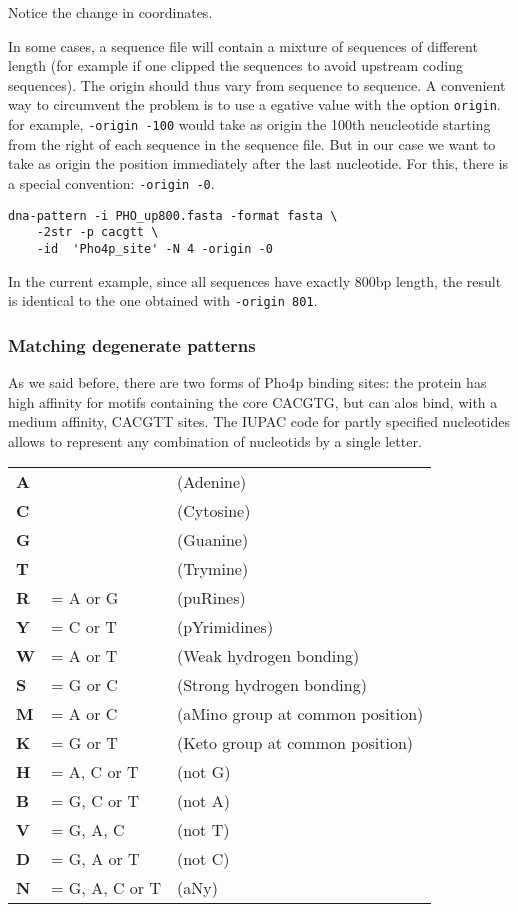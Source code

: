 Notice the change in coordinates.

In some cases, a sequence file will contain a mixture of sequences of
different length (for example if one clipped the sequences to avoid
upstream coding sequences). The origin should thus vary from sequence
to sequence. A convenient way to circumvent the problem is to use a
egative value with the option \texttt{origin}. for example,
\texttt{-origin -100} would take as origin the 100th neucleotide
starting from the right of each sequence in the sequence file. But in
our case we want to take as origin the position immediately after the
last nucleotide. For this, there is a special convention: \texttt{-origin
-0}.

\begin{verbatim}
dna-pattern -i PHO_up800.fasta -format fasta \
    -2str -p cacgtt \
    -id  'Pho4p_site' -N 4 -origin -0
\end{verbatim}

In the current example, since all sequences have exactly 800bp length,
the result is identical to the one obtained with \texttt{-origin 801}.

\subsubsection{Matching degenerate patterns}

As we said before, there are two forms of Pho4p binding sites: the
protein has high affinity for motifs containing the core CACGTG, but
can alos bind, with a medium affinity, CACGTT sites. The IUPAC code
for partly specified nucleotides allows to represent any combination
of nucleotids by a single letter.

\begin{tabular}{lll}
\textbf{A} &  & (Adenine) \\
\textbf{C} &  & (Cytosine) \\
\textbf{G} &  & (Guanine) \\
\textbf{T} &  & (Trymine) \\
\textbf{R} & = A or G & (puRines) \\
\textbf{Y} & = C or T & (pYrimidines) \\
\textbf{W} & = A or T & (Weak hydrogen bonding) \\
\textbf{S} & = G or C & (Strong hydrogen bonding) \\
\textbf{M} & = A or C & (aMino group at common position) \\
\textbf{K} & = G or T & (Keto group at common position) \\
\textbf{H} & = A, C or T & (not G) \\
\textbf{B} & = G, C or T & (not A) \\
\textbf{V} & = G, A, C & (not T) \\
\textbf{D} & = G, A or T & (not C) \\
\textbf{N} & = G, A, C or T & (aNy) \\
\end{tabular}

